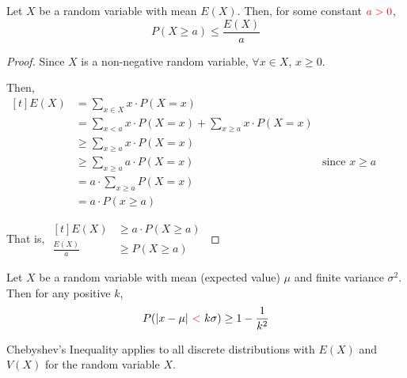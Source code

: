 \begin{theorem}
    Let $X$ be a  random variable with mean $E(X)$. Then, for some constant $\color{red} a > 0$, $$P(X \ge a) \le \frac{E(X)}{a}$$
\end{theorem}

\begin{proof}
    Since $X$ is a non-negative random variable, $\forall x \in X$, $x \ge 0$. 

    Then, $\begin{aligned}[t]
        E(X) & = \sum_{x \in X} x \cdot P(X = x)                                 \\
             & = \sum_{x < a} x \cdot P(X = x) + \sum_{x \ge a} x \cdot P(X = x) \\
             & \ge \sum_{x \ge a} x \cdot P(X = x)                               \\
             & \ge \sum_{x \ge a} a \cdot P(X = x) & \text{since } x \ge a       \\
             & = a \cdot \sum_{x \ge a} P(X = x)                                 \\
             & = a \cdot P(x \ge a)
    \end{aligned}$

    That is, $\begin{aligned}[t]
        E(X)           & \ge a \cdot P(X \ge a) \\
        \frac{E(X)}{a} & \ge P(X \ge a)
    \end{aligned}$
\end{proof}

\begin{theorem}
    Let $X$ be a random variable with mean (expected value) $\mu$ and finite variance $\sigma^2$. Then for any positive $k$, $$P(|x - \mu| {\color{red}~<~} k\sigma) \ge 1 - \frac{1}{k^2}$$

    Chebyshev's Inequality applies to all discrete distributions with  $E(X)$ and $V(X)$ for the random variable $X$. 
\end{theorem}

